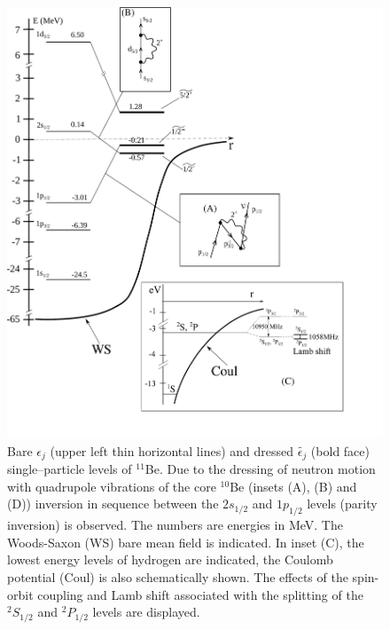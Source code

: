    \begin{figure}
   \centerline{\includegraphics*[width=12cm,angle=0]{C8/figsC8/Fig6_2_1}}
   	\caption{Bare $\epsilon_j$ (upper left  thin horizontal lines) and dressed $\tilde{\epsilon_j}$ (bold face)
   	single--particle levels of $^{11}$Be. Due to the dressing of neutron motion with  quadrupole vibrations
   	of the core $^{10}$Be (insets (A), (B) and (D)) inversion in sequence between the 
   	$ 2s_{1/2}$ and $ 1p_{1/2}$ levels  (parity inversion) is observed. The numbers  are   energies in MeV. The Woods-Saxon (WS) bare mean field is indicated.
   	In inset (C), the lowest energy levels of hydrogen 
   	are indicated, the Coulomb potential (Coul) is also schematically shown.
   	The effects of the spin-orbit coupling and Lamb shift associated with the splitting of the 
   	$^2S_{1/2}$ and $^2P_{1/2}$ levels are displayed.}\label{fig6.2.1x}
   \end{figure} 
